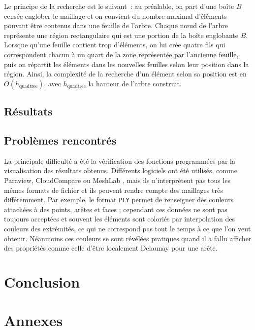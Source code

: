 \documentclass[12pt,a4paper]{report}
\begin{document}
Le principe de la recherche est le suivant~: au préalable, on part d'une boîte $B$ censée englober le maillage et on convient du nombre maximal d'éléments pouvant être contenus dans une feuille de l'arbre. Chaque n\oe{}ud de l'arbre représente une région rectangulaire qui est une portion de la boîte englobante $B$. Lorsque qu'une feuille contient trop d'éléments, on lui crée quatre fils qui correspondent chacun à un quart de la zone représentée par l'ancienne feuille, puis on répartit les éléments dans les nouvelles feuilles selon leur position dans la région. Ainsi, la complexité de la recherche d'un élément selon sa position est en $O(h_{\text{quadtree}})$, avec $h_{\text{quadtree}}$ la hauteur de l'arbre construit.

\subsection{Résultats}


\subsection{Problèmes rencontrés}

La principale difficulté a été la vérification des fonctions programmées par la visualisation des résultats obtenus. Différents logiciels ont été utilisés, comme Paraview, CloudCompare ou MeshLab \cite{Paraview, CloudCompare, MeshLab}, mais ils n'interprètent pas tous les mêmes formats de fichier et ils peuvent rendre compte des maillages très différemment. Par exemple, le format \verb+PLY+ permet de renseigner des couleurs attachées à des points, arêtes et faces ; cependant ces données ne sont pas toujours acceptées et souvent les éléments sont coloriés par interpolation des couleurs des extrémités, ce qui ne correspond pas tout le temps à ce que l'on veut obtenir. Néanmoins ces couleurs se sont révélées pratiques quand il a fallu afficher des propriétés comme celle d'être localement Delaunay pour une arête.

\newpage
\section{Conclusion}

\newpage
\section{Annexes}
\end{document}
